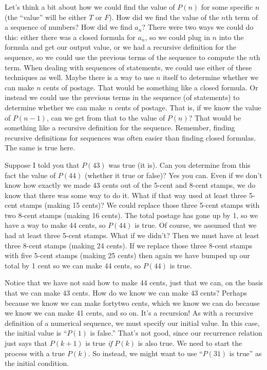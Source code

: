 \documentclass[12pt]{article}
\begin{document}
Let's think a bit about how we could find the value of $P(n)$ for some specific $n$ (the ``value'' will be either $T$ or $F$).  How did we find the value of the $n$th term of a sequence of numbers? How did we find $a_n$?  There were two ways we could do this: either there was a closed formula for $a_n$, so we could plug in $n$ into the formula and get our output value, or we had a recursive definition for the sequence, so we could use the previous terms of the sequence to compute the $n$th term.  When dealing with sequences of statements, we could use either of these techniques as well.  Maybe there is a way to use $n$ itself to determine whether we can make $n$ cents of postage.  That would be something like a closed formula.  Or instead we could use the previous terms in the sequence (of statements) to determine whether we can make $n$ cents of postage.  That is, if we know the value of $P(n-1)$, can we get from that to the value of $P(n)$?  That would be something like a recursive definition for the sequence.  Remember, finding recursive definitions for sequences was often easier than finding closed formulas.  The same is true here.

Suppose I told you that $P(43)$ was true (it is).  Can you determine from this fact the value of $P(44)$ (whether it true or false)?  Yes you can. Even if we don't know how exactly we made 43 cents out of the 5-cent and 8-cent stamps, we do know that there was some way to do it.  What if that way used at least three 5-cent stamps  (making 15 cents)?  We could replace those three 5-cent stamps with two 8-cent stamps (making 16 cents).  The total postage has gone up by 1, so we have a way to make 44 cents, so $P(44)$ is true.  Of course, we assumed that we had at least three 5-cent stamps.  What if we didn't? Then we must have at least three 8-cent stamps (making 24 cents).  If we replace those three 8-cent stamps with five 5-cent stamps (making 25 cents) then again we have bumped up our total by 1 cent so we can make 44 cents, so $P(44)$ is true.

Notice that we have not said how to make 44 cents, just that we can, on the basis that we can make 43 cents.  How do we know we can make 43 cents?  Perhaps because we know we can make \gls{fortytwo} cents, which we know we can do because we know we can make 41 cents, and so on.  It's a recursion!  As with a recursive definition of a numerical sequence, we must specify our initial value.  In this case, the initial value is ``$P(1)$ is false.''  That's not good, since our recurrence relation just says that $P(k+1)$ is true {\em if} $P(k)$ is also true.  We need to start the process with a true $P(k)$.  So instead, we might want to use ``$P(31)$ is true'' as the initial condition.
\end{document}
